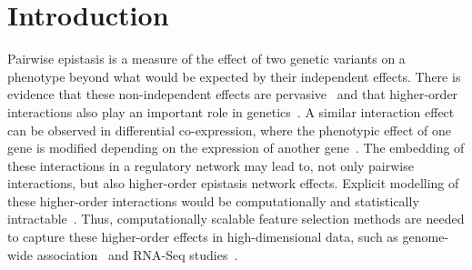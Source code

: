 \documentclass{bioinfo}
\begin{document}

\maketitle

\newpage

\section{Introduction}

Pairwise epistasis is a measure of the effect of two genetic variants on a phenotype beyond what would be expected by their independent effects.
There is evidence that these non-independent effects are pervasive~\citep{breen12} and that higher-order interactions also play an important role in genetics~\citep{weinreich13}.
A similar interaction effect can be observed in differential co-expression, where the phenotypic effect of one gene is modified depending on the expression of another gene~\citep{lareau15,diffcoexp10}.
The embedding of these interactions in a regulatory network may lead to, not only pairwise interactions, but also higher-order epistasis network effects.
Explicit modelling of these higher-order interactions would be computationally and statistically intractable~\citep{riesselman18}.
Thus, computationally scalable feature selection methods are needed to capture these higher-order effects in high-dimensional data, such as genome-wide association~\citep{titv} and RNA-Seq studies~\citep{stir}.
\end{document}
